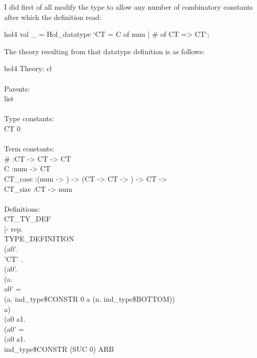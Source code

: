 I did first of all modify the type to allow any number of combinatory constants after which the definition read:

\begin{GFT}{hol4}
\+val \_ = Hol\_datatype `CT = C of num | \# of CT => CT`;\\
\end{GFT}

The theory resulting from that datatype definition is as follows:

\begin{GFT}{hol4}
\+Theory: cl\\
\+\\
\+Parents:\\
\+    list\\
\+\\
\+Type constants:\\
\+    CT 0\\
\+\\
\+Term constants:\\
\+    \#    :CT -> CT -> CT\\
\+    C    :num -> CT\\
\+    CT\_case    :(num -> \MMM{\alpha}) -> (CT -> CT -> \MMM{\alpha}) -> CT -> \MMM{\alpha}\\
\+    CT\_size    :CT -> num\\
\+\\
\+Definitions:\\
\+    CT\_TY\_DEF\\
\+    |- \MMM{\exists}rep.\\
\+         TYPE\_DEFINITION\\
\+           (\MMM{\lambda}a0'.\\
\+              \MMM{\forall}'CT' .\\
\+                (\MMM{\forall}a0'.\\
\+                   (\MMM{\exists}a.\\
\+                      a0' =\\
\+                      (\MMM{\lambda}a. ind\_type\$CONSTR 0 a (\MMM{\lambda}n. ind\_type\$BOTTOM))\\
\+                        a) \MMM{\lor}\\
\+                   (\MMM{\exists}a0 a1.\\
\+                      (a0' =\\
\+                       (\MMM{\lambda}a0 a1.\\
\+                          ind\_type\$CONSTR (SUC 0) ARB\\

\end{GFT}

